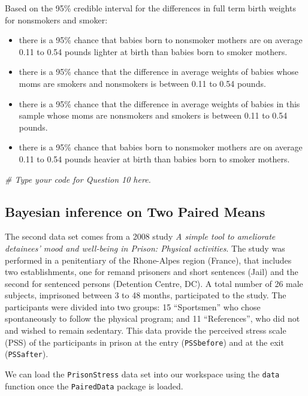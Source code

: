 \documentclass[]{article}
\newenvironment{Shaded}{\begin{snugshade}}{\end{snugshade}}
\newcommand{\CommentTok}[1]{\textcolor[rgb]{0.56,0.35,0.01}{\textit{#1}}}
\providecommand{\tightlist}{%
  \setlength{\itemsep}{0pt}\setlength{\parskip}{0pt}}
\begin{document}
Based on the 95\% credible interval for the differences in full term
birth weights for nonsmokers and smoker:

\begin{itemize}
\tightlist
\item
  there is a 95\% chance that babies born to nonsmoker mothers are on
  average 0.11 to 0.54 pounds lighter at birth than babies born to
  smoker mothers.
\item
  there is a 95\% chance that the difference in average weights of
  babies whose moms are smokers and nonsmokers is between 0.11 to 0.54
  pounds.
\item
  there is a 95\% chance that the difference in average weights of
  babies in this sample whose moms are nonsmokers and smokers is between
  0.11 to 0.54 pounds.
\item
  there is a 95\% chance that babies born to nonsmoker mothers are on
  average 0.11 to 0.54 pounds heavier at birth than babies born to
  smoker mothers.
\end{itemize}

\begin{Shaded}
\begin{Highlighting}[]
\CommentTok{# Type your code for Question 10 here.}
\end{Highlighting}
\end{Shaded}

\subsection{Bayesian inference on Two Paired
Means}\label{bayesian-inference-on-two-paired-means}

The second data set comes from a 2008 study \emph{A simple tool to
ameliorate detainees' mood and well-being in Prison: Physical
activities}. The study was performed in a penitentiary of the
Rhone-Alpes region (France), that includes two establishments, one for
remand prisoners and short sentences (Jail) and the second for sentenced
persons (Detention Centre, DC). A total number of 26 male subjects,
imprisoned between 3 to 48 months, participated to the study. The
participants were divided into two groups: 15 ``Sportsmen'' who chose
spontaneously to follow the physical program; and 11 ``References'', who
did not and wished to remain sedentary. This data provide the perceived
stress scale (PSS) of the participants in prison at the entry
(\texttt{PSSbefore}) and at the exit (\texttt{PSSafter}).

We can load the \texttt{PrisonStress} data set into our workspace using
the \texttt{data} function once the \texttt{PairedData} package is
loaded.
\end{document}
